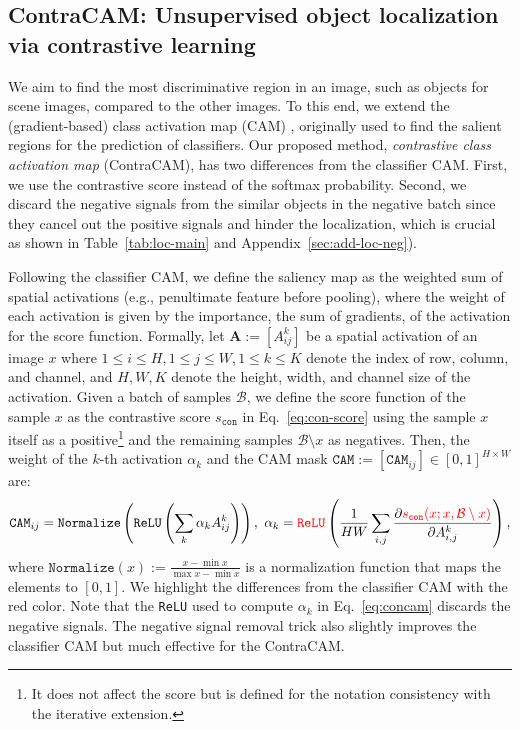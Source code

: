 \documentclass{article}
\begin{document}
\subsection{ContraCAM: Unsupervised object localization via contrastive learning}
\label{sec:method-concam}

We aim to find the most discriminative region in an image, such as objects for scene images, compared to the other images. To this end, we extend the (gradient-based) class activation map (CAM) \citep{zhou2016learning,selvaraju2017grad}, originally used to find the salient regions for the prediction of classifiers. Our proposed method, \textit{contrastive class activation map} (ContraCAM), has two differences from the classifier CAM. First, we use the contrastive score instead of the softmax probability. Second, we discard the negative signals from the similar objects in the negative batch since they cancel out the positive signals and hinder the localization, which is crucial as shown in Table~\ref{tab:loc-main} and Appendix~\ref{sec:add-loc-neg}).

Following the classifier CAM, we define the saliency map as the weighted sum of spatial activations (e.g., penultimate feature before pooling), where the weight of each activation is given by the importance, the sum of gradients, of the activation for the score function. Formally, let $\mathbf{A} := [A_{ij}^k]$ be a spatial activation of an image $x$ where $1 \le i \le H, 1 \le j \le W, 1 \le k \le K$ denote the index of row, column, and channel, and $H, W, K$ denote the height, width, and channel size of the activation. Given a batch of samples $\mathcal{B}$, we define the score function of the sample $x$ as the contrastive score $s_\texttt{con}$ in Eq.~\eqref{eq:con-score} using the sample $x$ itself as a positive\footnote{It does not affect the score but is defined for the notation consistency with the iterative extension.} and the remaining samples $\mathcal{B} \setminus x$ as negatives. Then, the weight of the $k$-th activation $\alpha_k$ and the CAM mask $\texttt{CAM} := [\texttt{CAM}_{ij}] \in [0,1]^{H \times W}$ are:
\begin{align}
\texttt{CAM}_{ij} = \texttt{Normalize}\left( \texttt{ReLU}\left( \sum_k \alpha_k A_{ij}^k \right) \right), ~\alpha_k = {\color{red}\texttt{ReLU}} \left( \frac{1}{HW} \sum_{i,j} \frac{\partial {\color{red} s_\texttt{con}(x; x, \mathcal{B} \setminus x)}}{\partial A^k_{i,j}} \right),
\label{eq:concam}
\end{align}
where $\texttt{Normalize}(x) := \frac{x - \min{x}}{\max{x} - \min{x}}$ is a normalization function that maps the elements to $[0,1]$. We highlight the differences from the classifier CAM with the red color. Note that the \texttt{ReLU} used to compute $\alpha_{k}$ in Eq.~\eqref{eq:concam} discards the negative signals. The negative signal removal trick also slightly improves the classifier CAM \cite{bae2020rethinking} but much effective for the ContraCAM.
\end{document}

